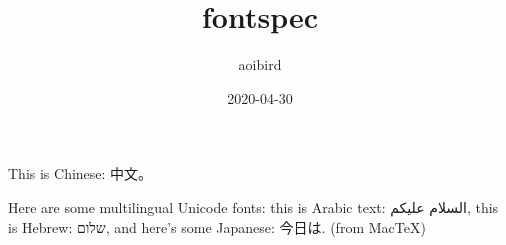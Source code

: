 \documentclass[12pt]{article}
\title{fontspec}
\author{aoibird}
\date{2020-04-30}
\begin{document}
\maketitle

This is Chinese: {\C 中文。}

Here are some multilingual Unicode fonts: this is Arabic text: {\A السلام عليكم}, this is Hebrew: {\Z שלום},
and here's some Japanese: {\J 今日は}. (from MacTeX)
\end{document}
